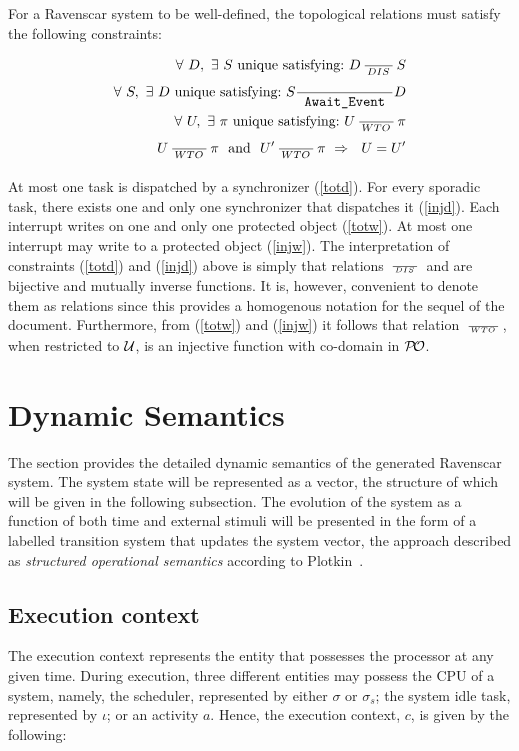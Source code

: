 For a Ravenscar system to be well-defined, the topological relations
must satisfy the following constraints:

\begin{eqnarray}
\label{totd} \forall \ D, \ \exists  \ S \  \text{unique satisfying:} \ D \RL{DIS} S  \\
\label{injd} \forall \ S, \ \exists  \ D \  \text{unique satisfying:} \ S \rgvt D \\
\label{totw}\ \forall \ U, \ \exists \ \pi \  \text{unique satisfying:} \ U \RL{WTO} \pi \\
\label{injw} \ U \RL{WTO} \pi \ \ \text{and} \  \ U' \RL{WTO} \pi \ \Rightarrow \  \ U=U'
\end{eqnarray}

At most one task is dispatched by a synchronizer (\ref{totd}). For
every sporadic task, there exists one and only one synchronizer that
dispatches it (\ref{injd}). Each interrupt writes on one and
only one protected object (\ref{totw}). At most one interrupt
may write to a protected object (\ref{injw}). The
interpretation of constraints (\ref{totd}) and (\ref{injd}) above is
simply that relations $\,\frac{}{\,^{{DIS}}\,}\,$ and \rgvt are bijective and mutually
inverse functions. It is, however, convenient to denote them as
relations since this provides a homogenous notation  for the sequel of
the document. Furthermore, from (\ref{totw}) and (\ref{injw}) it
follows that relation $\,\frac{}{\,^{{WTO}}\,}\,$, when restricted to ${\cal U}$, is an
injective function with co-domain in ${\cal P\!O}$.

\section{Dynamic Semantics}
\label{sec:dynamic_semantics}
The section provides the detailed dynamic semantics of the generated
Ravenscar system. The system state will be represented as a vector,
the structure of which will be given in the following subsection. The
evolution of the system as a function of both time and external
stimuli will be presented in the form of a labelled transition system
that updates the system vector, the approach described as
\emph{structured operational semantics} according to
Plotkin~\cite{plotkin-sos}.

\subsection{Execution context}
The execution context represents the entity that possesses the
processor at any given time. During execution, three different
entities may possess the CPU of a system, namely, the scheduler,
represented by either $\sigma$ or $\sigma_s$; the system idle task,
represented by $\iota$; or an activity $a$. Hence, the execution
context, $c$, is given by the following:

